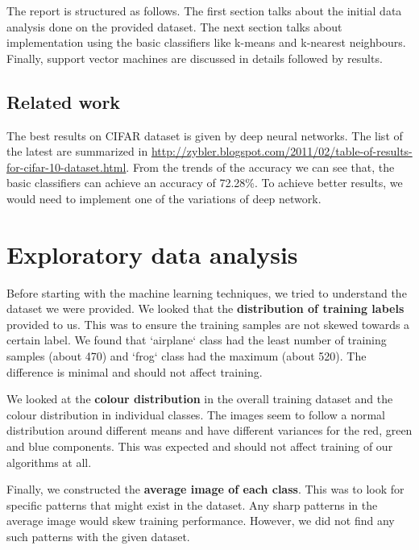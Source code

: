 \documentclass{article} %
\begin{document}
The report is structured as follows. The first section talks about the initial data analysis done on the provided dataset. The next section talks about implementation using the basic classifiers like k-means and k-nearest neighbours. Finally, support vector machines are discussed in details followed by results.

\subsection{Related work}
The best results on CIFAR dataset is given by deep neural networks. The list of the latest are summarized in \url{http://zybler.blogspot.com/2011/02/table-of-results-for-cifar-10-dataset.html}. From the trends of the accuracy we can see that, the basic classifiers can achieve an accuracy of 72.28\%. To achieve better results, we would need to implement one of the variations of deep network.

\section{Exploratory data analysis}
    Before starting with the machine learning techniques, we tried to understand the dataset we were provided. We looked that the \textbf{distribution of training labels} provided to us. This was to ensure the training samples are not skewed towards a certain label. We found that `airplane` class had the least number of training samples (about 470) and `frog` class had the maximum (about 520). The difference is minimal and should not affect training.

    We looked at the \textbf{colour distribution} in the overall training dataset and the colour distribution in individual classes. The images seem to follow a normal distribution around different means and have different variances for the red, green and blue components. This was expected and should not affect training of our algorithms at all.

    Finally, we constructed the \textbf{average image of each class}. This was to look for specific patterns that might exist in the dataset. Any sharp patterns in the average image would skew training performance. However, we did not find any such patterns with the given dataset.
\end{document}
